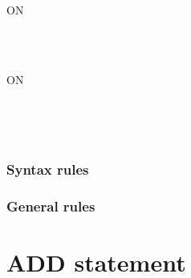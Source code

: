 \begin{syntax}[\miscextcolour]
  \begin{minipage}[!h]{1.0\linewidth}
     \identifier {}
    \begin{1=}
       \\
      \begin{1=}
        \identifier \\
        \literal
      \end{1=} \\
       \\
    \end{1=}

    \begin{0+}
      ON
      \begin{1=}
         \\
      \end{1=}
      \imperativestatement \\

       ON
      \begin{1=}
         \\
      \end{1=}
      \imperativestatement \\
    \end{0+}
  \end{minipage}
\end{syntax}

\begin{syntax}[\deletedcolour]
\end{syntax}

\subsubsection{Syntax rules}

\subsubsection{General rules}

\section{ADD statement}

